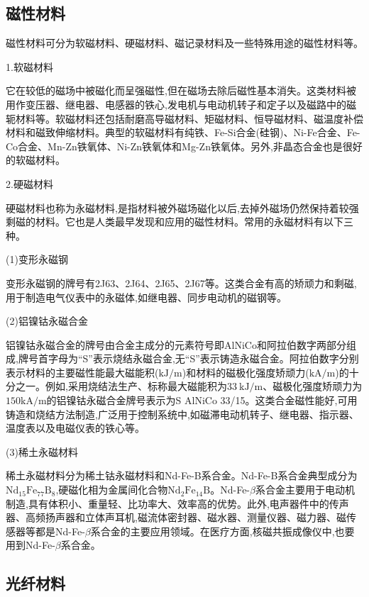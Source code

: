 \documentclass[UTF8]{ctexbook}
\newcommand{\◎}{\ensuremath{\bigcirc}}
\begin{document}
\subsection{磁性材料}

磁性材料可分为软磁材料、硬磁材料、磁记录材料及一些特殊用途的磁性材料等。

1.软磁材料

它在较低的磁场中被磁化而呈强磁性,但在磁场去除后磁性基本消失。这类材料被用作变压器、继电器、电感器的铁心,发电机与电动机转子和定子以及磁路中的磁轭材料等。软磁材料还包括耐磨高导磁材料、矩磁材料、恒导磁材料、磁温度补偿材料和磁致伸缩材料。典型的软磁材料有纯铁、Fe-Si合金(硅钢)、Ni-Fe合金、Fe-Co合金、Mn-Zn铁氧体、Ni-Zn铁氧体和Mg-Zn铁氧体。另外,非晶态合金也是很好的软磁材料。

2.硬磁材料

硬磁材料也称为永磁材料,是指材料被外磁场磁化以后,去掉外磁场仍然保持着较强剩磁的材料。它也是人类最早发现和应用的磁性材料。常用的永磁材料有以下三种。

(1)变形永磁钢

变形永磁钢的牌号有2J63、2J64、2J65、2J67等。这类合金有高的矫顽力和剩磁,用于制造电气仪表中的永磁体,如继电器、同步电动机的磁钢等。

(2)铝镍钴永磁合金

铝镍钴永磁合金的牌号由合金主成分的元素符号即AlNiCo和阿拉伯数字两部分组成,牌号首字母为“S”表示烧结永磁合金,无“S”表示铸造永磁合金。阿拉伯数字分别表示材料的主要磁性能最大磁能积($\mathrm{kJ/m}$)和材料的磁极化强度矫顽力($\mathrm{kA/m}$)的十分之一。例如,采用烧结法生产、标称最大磁能积为$33~\mathrm{kJ/m}$、磁极化强度矫顽力为$150\mathrm{kA/m}$的铝镍钴永磁合金牌号表示为S AlNiCo 33/15。这类合金磁性能好,可用铸造和烧结方法制造,广泛用于控制系统中,如磁滞电动机转子、继电器、指示器、温度表以及电磁仪表的铁心等。

(3)稀土永磁材料

稀土永磁材料分为稀土钴永磁材料和Nd-Fe-B系合金。Nd-Fe-B系合金典型成分为$\mathrm{Nd_{15}Fe_{77}B_8}$,硬磁化相为金属间化合物$\mathrm{Nd_2Fe_{14}B}$。Nd-Fe-$\beta$系合金主要用于电动机制造,具有体积小、重量轻、比功率大、效率高的优势。此外,电声器件中的传声器、高频扬声器和立体声耳机,磁流体密封器、磁水器、测量仪器、磁力器、磁传感器等都是Nd-Fe-$\beta$系合金的主要应用领域。在医疗方面,核磁共振成像仪中,也要用到Nd-Fe-$\beta$系合金。

\subsection{光纤材料}
\end{document}
